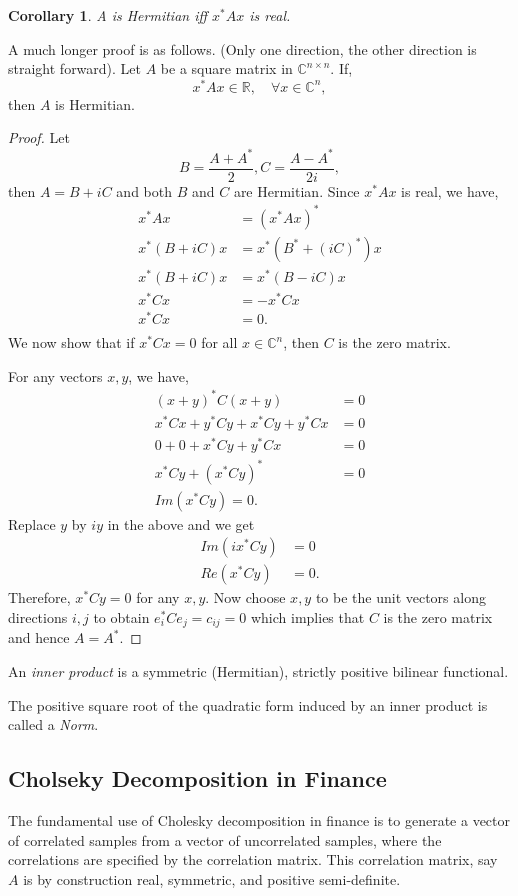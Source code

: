 \documentclass{amsart}
\theoremstyle{plain}
\newtheorem{corollary}{Corollary}
\numberwithin{equation}{section}
\begin{document}
\begin{corollary}
	A is Hermitian iff $x^*Ax$ is real.
\end{corollary}

A much longer proof is as follows. (Only one direction,
the other direction is straight forward). Let $A$ be 
a square matrix in $\mathbb{C}^{n \times n}$.
If,
$$ x^*Ax \in \mathbb{R}, \quad \forall x \in \mathbb{C}^n,$$
then $A$ is Hermitian. 

\begin{proof}
Let 
$$B = \frac{A + A^*}{2}, C=\frac{A-A^*}{2i},$$
then $A = B+iC$ and both $B$ and $C$ are Hermitian. 
Since $x^*Ax$ is real, we have, 
\begin{align*}
x^*Ax &= (x^*Ax)^* \\
x^*(B+iC)x &= x^*(B^* + (iC)^*)x\\
x^*(B+iC)x &= x^*(B - iC)x\\
x^*Cx &= -x^*Cx\\
x^*Cx &= 0.\\
\end{align*}
We now show that if $x^*Cx=0$ for all $x \in \mathbb{C}^n$, then 
$C$ is the zero matrix. 


For any vectors $x, y$, we have,
\begin{align*}
(x+y)^*C(x+y) &= 0\\
x^*Cx+ y^*Cy + x^*Cy + y^*Cx  &= 0\\
0 + 0 + x^*Cy + y^*Cx  &= 0\\
x^*Cy + (x^*Cy)^* &= 0\\
Im(x^*Cy) = 0.
\end{align*}
Replace $y$ by $iy$ in the above and we get
\begin{align*}
Im(ix^*Cy) &=0\\
Re(x^*Cy) &= 0.
\end{align*}
Therefore, $x^*Cy = 0$ for any $x, y$.
Now choose $x, y$ to be the unit vectors along directions $i, j$ to obtain
$e_i^*Ce_j = c_{ij} = 0$ which implies that $C$ is the zero matrix and 
hence $A = A^*$. 

\end{proof}


An \emph{inner product} is a symmetric (Hermitian), 
strictly positive bilinear functional.

The positive square root of the quadratic form 
induced by an inner product is called a 
\emph{Norm}.


\subsection{Cholseky Decomposition in Finance}
The fundamental use of Cholesky decomposition 
in finance is to generate a vector of correlated
samples from a vector of uncorrelated samples, where
the correlations are specified by the correlation 
matrix. This correlation matrix, say $A$ is by 
construction real, symmetric, and positive semi-definite.
\end{document}
